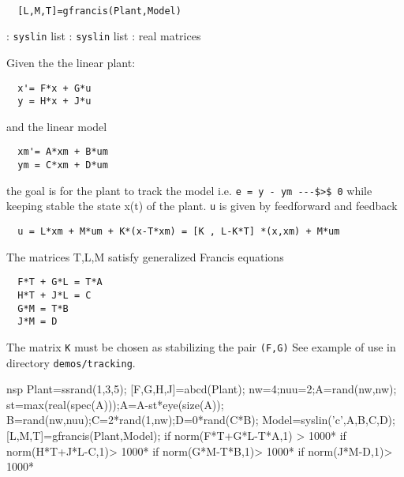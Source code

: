 \begin{mandesc}
   \\ %
\end{mandesc}
\begin{calling_sequence}
\begin{verbatim}
  [L,M,T]=gfrancis(Plant,Model)  
\end{verbatim}
\end{calling_sequence}
\begin{parameters}
  \begin{varlist}
    : \verb!syslin! list
    : \verb!syslin! list
    : real matrices
  \end{varlist}
\end{parameters}
\begin{mandescription}
  Given the the linear plant:
\begin{verbatim}
  x'= F*x + G*u 
  y = H*x + J*u
\end{verbatim}
and the linear model
\begin{verbatim}
  xm'= A*xm + B*um
  ym = C*xm + D*um
\end{verbatim}
the goal is for the plant to track the model i.e. \verb!e = y - ym ---$>$ 0!
while keeping stable the state x(t) of the plant. 
\verb!u! is given by feedforward and feedback
\begin{verbatim}
  u = L*xm + M*um + K*(x-T*xm) = [K , L-K*T] *(x,xm) + M*um
\end{verbatim}
The matrices T,L,M satisfy generalized Francis equations
\begin{verbatim}
  F*T + G*L = T*A
  H*T + J*L = C
  G*M = T*B
  J*M = D
\end{verbatim}
The matrix \verb!K! must be chosen as stabilizing the pair \verb!(F,G)!
See example of use in directory \verb!demos/tracking!.
\end{mandescription}
\begin{examples}
  \begin{mintednsp}{nsp}
    Plant=ssrand(1,3,5);
    [F,G,H,J]=abcd(Plant);
    nw=4;nuu=2;A=rand(nw,nw);
    st=max(real(spec(A)));A=A-st*eye(size(A));
    B=rand(nw,nuu);C=2*rand(1,nw);D=0*rand(C*B);
    Model=syslin('c',A,B,C,D);
    [L,M,T]=gfrancis(Plant,Model);
    if norm(F*T+G*L-T*A,1) > 1000*%
    if norm(H*T+J*L-C,1)> 1000*%
    if norm(G*M-T*B,1)> 1000*%
    if norm(J*M-D,1)> 1000*%
  \end{mintednsp}
\end{examples}
\begin{manseealso}
     
\end{manseealso}
